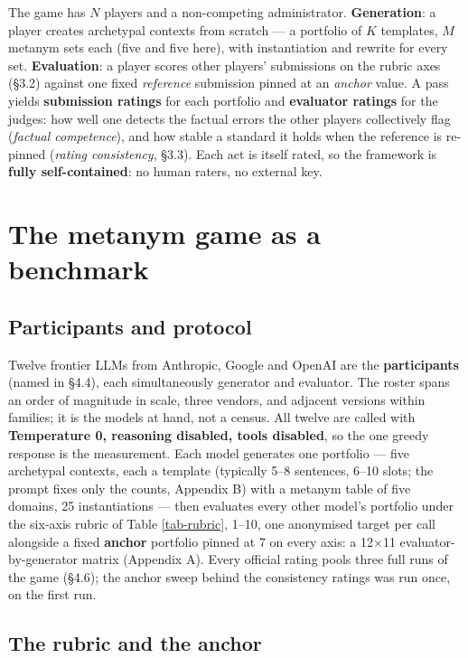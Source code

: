 \documentclass{article}
\begin{document}
The game has \(N\) players and a non-competing administrator. \textbf{Generation}: a player creates archetypal contexts from scratch --- a portfolio of \(K\) templates, \(M\) metanym sets each (five and five here), with instantiation and rewrite for every set. \textbf{Evaluation}: a player scores other players' submissions on the rubric axes (\S{}3.2) against one fixed \emph{reference} submission pinned at an \emph{anchor} value. A pass yields \textbf{submission ratings} for each portfolio and \textbf{evaluator ratings} for the judges: how well one detects the factual errors the other players collectively flag (\emph{factual competence}), and how stable a standard it holds when the reference is re-pinned (\emph{rating consistency}, \S{}3.3). Each act is itself rated, so the framework is \textbf{fully self-contained}: no human raters, no external key.

\section{The metanym game as a benchmark}\label{the-metanym-game-as-a-benchmark}

\subsection{Participants and protocol}\label{participants-and-protocol}

Twelve frontier LLMs from Anthropic, Google and OpenAI are the \textbf{participants} (named in \S{}4.4), each simultaneously generator and evaluator. The roster spans an order of magnitude in scale, three vendors, and adjacent versions within families; it is the models at hand, not a census. All twelve are called with \textbf{Temperature 0, reasoning disabled, tools disabled}, so the one greedy response is the measurement. Each model generates one portfolio --- five archetypal contexts, each a template (typically 5--8 sentences, 6--10 slots; the prompt fixes only the counts, Appendix B) with a metanym table of five domains, 25 instantiations --- then evaluates every other model's portfolio under the six-axis rubric of Table \ref{tab-rubric}, 1--10, one anonymised target per call alongside a fixed \textbf{anchor} portfolio pinned at 7 on every axis: a 12\ensuremath{\times}11 evaluator-by-generator matrix (Appendix A). Every official rating pools three full runs of the game (\S{}4.6); the anchor sweep behind the consistency ratings was run once, on the first run.

\subsection{The rubric and the anchor}\label{the-rubric-and-the-anchor}
\end{document}
